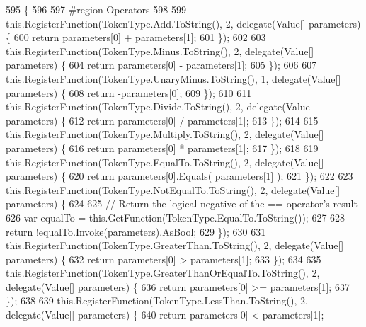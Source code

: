 \begin{DoxyCode}
595                                      \{
596 
597 \textcolor{preprocessor}{                #region Operators}
598 \textcolor{preprocessor}{}
599                 this.RegisterFunction(TokenType.Add.ToString(), 2, delegate(Value[] parameters) \{
600                     \textcolor{keywordflow}{return} parameters[0] + parameters[1];
601                 \});
602 
603                 this.RegisterFunction(TokenType.Minus.ToString(), 2, delegate(Value[] parameters) \{
604                     \textcolor{keywordflow}{return} parameters[0] - parameters[1];
605                 \});
606 
607                 this.RegisterFunction(TokenType.UnaryMinus.ToString(), 1, delegate(Value[] parameters) \{
608                     \textcolor{keywordflow}{return} -parameters[0];
609                 \});
610 
611                 this.RegisterFunction(TokenType.Divide.ToString(), 2, delegate(Value[] parameters) \{
612                     \textcolor{keywordflow}{return} parameters[0] / parameters[1];
613                 \});
614 
615                 this.RegisterFunction(TokenType.Multiply.ToString(), 2, delegate(Value[] parameters) \{
616                     \textcolor{keywordflow}{return} parameters[0] * parameters[1];
617                 \});
618 
619                 this.RegisterFunction(TokenType.EqualTo.ToString(), 2, delegate(Value[] parameters) \{
620                     \textcolor{keywordflow}{return} parameters[0].Equals( parameters[1] );
621                 \});
622 
623                 this.RegisterFunction(TokenType.NotEqualTo.ToString(), 2, delegate(Value[] parameters) \{
624 
625                     \textcolor{comment}{// Return the logical negative of the == operator's result}
626                     var equalTo = this.GetFunction(TokenType.EqualTo.ToString());
627 
628                     \textcolor{keywordflow}{return} !equalTo.Invoke(parameters).AsBool;
629                 \});
630 
631                 this.RegisterFunction(TokenType.GreaterThan.ToString(), 2, delegate(Value[] parameters) \{
632                     \textcolor{keywordflow}{return} parameters[0] > parameters[1];
633                 \});
634 
635                 this.RegisterFunction(TokenType.GreaterThanOrEqualTo.ToString(), 2, delegate(Value[] 
      parameters) \{
636                     \textcolor{keywordflow}{return} parameters[0] >= parameters[1];
637                 \});
638 
639                 this.RegisterFunction(TokenType.LessThan.ToString(), 2, delegate(Value[] parameters) \{
640                     \textcolor{keywordflow}{return} parameters[0] < parameters[1];

\end{DoxyCode}
